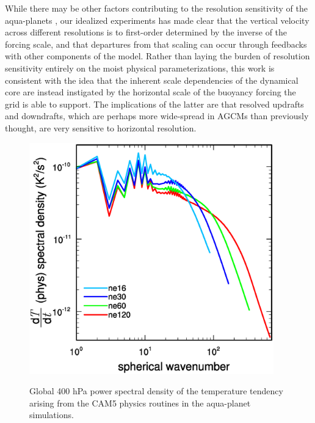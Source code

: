 While there may be other factors contributing to the resolution sensitivity of the aqua-planets \citep[e.g.,][]{LETAL2015JCLIM}, our idealized experiments has made clear that the vertical velocity across different resolutions is to first-order determined by the inverse of the forcing scale, and that departures from that scaling can occur through feedbacks with other components of the model. Rather than laying the burden of resolution sensitivity entirely on the moist physical parameterizations, this work is consistent with the idea that the inherent scale dependencies of the dynamical core are instead instigated by the horizontal scale of the buoyancy forcing the grid is able to support. The implications of the latter are that resolved updrafts and downdrafts, which are perhaps more wide-spread in AGCMs than previously thought, are very sensitive to horizontal resolution.

\begin{figure}
\begin{center}
\noindent\includegraphics[width=25pc,angle=0]{chapter3/SFigure1.eps}\\
\end{center}
\caption{Global 400 hPa power spectral density of the temperature tendency arising from the CAM5 physics routines in the aqua-planet simulations.}
\label{fig:sfigure3-1}
\end{figure}

